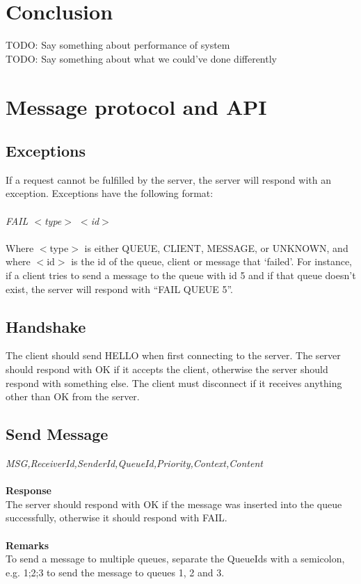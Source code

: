 \documentclass{article}
\begin{document}
    \section{Conclusion}
        TODO: Say something about performance of system\\
        TODO: Say something about what we could've done differently
    \clearpage
    \appendix
        \section{Message protocol and API}
        \label{sec:message_protocol_api}
            \subsection{Exceptions}
                If a request cannot be fulfilled by the server, the server will respond with an exception.  Exceptions have the following format:\\
                \\
                \indent\textit{FAIL $<$type$>$ $<$id$>$}\\
                \\
                Where $<$type$>$ is either QUEUE, CLIENT, MESSAGE, or UNKNOWN, and where $<$id$>$ is the id of the queue, client or message that ‘failed’. For instance, if a client tries to send a message to the queue with id 5 and if that queue doesn’t exist, the server will respond with “FAIL QUEUE 5”.

            \subsection{Handshake}
                The client should send HELLO when first connecting to the server. The server should respond with OK if it accepts the client, otherwise the server should respond with something else. The client must disconnect if it receives anything other than OK from the server.


            \subsection{Send Message}
                \indent\indent\textit{MSG,ReceiverId,SenderId,QueueId,Priority,Context,Content}\\
                \\
                \textbf{Response}\\
                The server should respond with OK if the message was inserted into the queue successfully, otherwise it should respond with FAIL.\\
                \\
                \textbf{Remarks}\\
                To send a message to multiple queues, separate the QueueIds with a semicolon, e.g. 1;2;3 to send the message to queues 1, 2 and 3.
\end{document}
